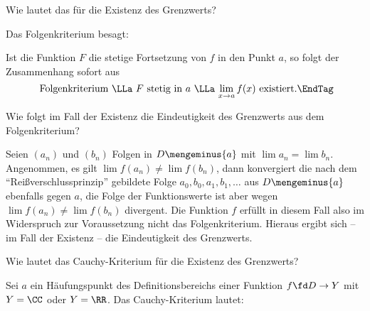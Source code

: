 \begin{frage}\label{03_flgk}
  Wie lautet das  für die Existenz des Grenzwerts?
\end{frage}

\begin{antwort}
  Das Folgenkriterium besagt: 

  \medskip
  \noindent{}  

  \medskip\noindent
  Ist die Funktion $F$ die stetige Fortsetzung 
  von $f$ in den Punkt $a$, so folgt der Zusammenhang sofort aus  
  \[
  \text{
    Folgenkriterium $\LLa$ 
    $F$ stetig in $a$ 
    $\LLa$
    $\lim_{x\to a} f(x)$ existiert.} \EndTag
  \]
\end{antwort}

\begin{frage}
  Wie folgt im Fall der Existenz 
  die Eindeutigkeit des Grenzwerts aus dem Folgenkriterium?
\end{frage}

\begin{antwort}
  Seien $(a_n)$ und $(b_n)$ Folgen 
  in $D\mengeminus\{ a\}$ mit $\lim a_n = \lim b_n$. Angenommen, es gilt 
  $\lim f(a_n) \not= \lim f(b_n)$, dann konvergiert
  die nach dem "`Reißverschlussprinzip"' 
  gebildete Folge $a_0,b_0,a_1,b_1,\ldots$ aus $D\mengeminus\{ a \}$ ebenfalls 
  gegen $a$, die Folge der Funktionswerte 
  ist aber wegen $\lim f(a_n) \not= \lim f(b_n)$ divergent. Die Funktion 
  $f$ erfüllt in diesem Fall also im Widerspruch zur Voraussetzung 
  nicht das Folgenkriterium. Hieraus ergibt sich 
  -- im Fall der Existenz -- die Eindeutigkeit des Grenzwerts.
  \AntEnd
\end{antwort} 

\begin{frage}
  Wie lautet das Cauchy-Kriterium für die Existenz des Grenzwerts?
\end{frage}

\begin{antwort}
  Sei $a$ ein Häufungspunkt des Definitionsbereichs einer Funktion 
  $f\fd D\to Y$ mit $Y=\CC$ oder $Y=\RR$. 
  Das Cauchy-Kriterium lautet: 

  \medskip
  \noindent{}
\end{antwort}


